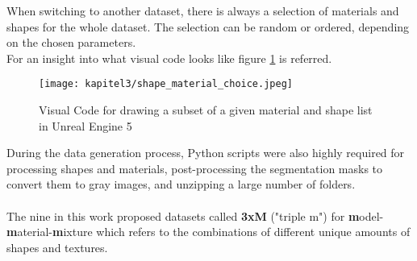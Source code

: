 		When switching to another dataset, there is always a selection of materials and shapes for the whole dataset. The selection can be random or ordered, depending on the chosen parameters. \\%
		For an insight into what visual code looks like figure \ref{img:ue5_material_shape_choice} is referred.
		
		\begin{figure}[h]
			\centering
			\texttt{[image: kapitel3/shape\_material\_choice.jpeg]}
			\caption[Visual Code for drawing a subset of a given material and shape list in Unreal Engine 5 by Tobia Ippolito]{Visual Code for drawing a subset of a given material and shape list in Unreal Engine 5}
			\label{img:ue5_material_shape_choice}
		\end{figure}
		
		During the data generation process, Python scripts were also highly required for processing shapes and materials, post-processing the segmentation masks to convert them to gray images, and unzipping a large number of folders.\\
		\\
		The nine in this work proposed datasets called \textbf{3xM} ("triple m") for \textbf{m}odel-\textbf{m}aterial-\textbf{m}ixture which refers to the combinations of different unique amounts of shapes and textures.
		
	\clearpage
